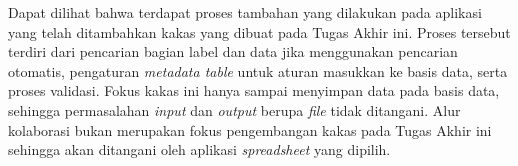Dapat dilihat bahwa terdapat proses tambahan yang dilakukan pada aplikasi yang telah ditambahkan kakas yang dibuat pada Tugas Akhir ini. Proses tersebut terdiri dari pencarian bagian label dan data jika menggunakan pencarian otomatis, pengaturan \textit{metadata table} untuk aturan masukkan ke basis data, serta proses validasi. Fokus kakas ini hanya sampai menyimpan data pada basis data, sehingga permasalahan \textit{input} dan \textit{output} berupa \textit{file} tidak ditangani. Alur kolaborasi bukan merupakan fokus pengembangan kakas pada Tugas Akhir ini sehingga akan ditangani oleh aplikasi \textit{spreadsheet} yang dipilih.

